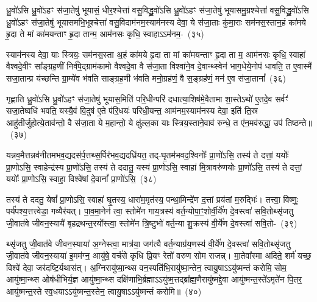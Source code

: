 {\anuvakamend[{वि ह्य॑ष्टाविꣳ॑शतिश्च}]}%

ध्रु॒वो॑\-ऽसि ध्रु॒वो॑\-ऽहꣳ स॑जा॒तेषु॑ भूयासं॒ धीर॒श्चेत्ता॑ वसु॒विद्ध्रु॒वो॑\-ऽसि ध्रु॒वो॑\-ऽहꣳ स॑जा॒तेषु॑ भूयासमु॒ग्रश्चेत्ता॑ वसु॒विद्ध्रु॒वो॑\-ऽसि ध्रु॒वो॑\-ऽहꣳ स॑जा॒तेषु॑ भूयासमभि॒भूश्चेत्ता॑ वसु॒विदाम॑नम॒स्याम॑नस्य देवा॒ ये स॑जा॒ताः कु॑मा॒राः सम॑नस॒स्तान॒हं का॑मये हृ॒दा ते मां का॑मयन्ताꣳ हृ॒दा तान्म॒ आम॑नसः कृधि॒ स्वाहा\-ऽऽ\-म॑नम॒-~(३५)

स्याम॑नस्य देवा॒ याः स्त्रियः॒ सम॑नस॒स्ता अ॒हं का॑मये हृ॒दा ता मां का॑मयन्ताꣳ हृ॒दा ता म॒ आम॑नसः कृधि॒ स्वाहा॑ वैश्वदे॒वीꣳ सा᳚ङ्ग्रह॒णीं निर्व॑पे॒द्ग्राम॑कामो वैश्वदे॒वा वै स॑जा॒ता विश्वा॑ने॒व दे॒वान्थ्स्वेन॑ भाग॒धेये॒नोप॑ धावति॒ त ए॒वास्मै॑ सजा॒तान्प्र य॑च्छन्ति ग्रा॒म्ये॑व भ॑वति साङ्ग्रह॒णी भ॑वति मनो॒ग्रह॑णं॒ वै स॒ङ्ग्रह॑णं॒ मन॑ ए॒व स॑जा॒तानां᳚~(३६)

गृह्णाति ध्रु॒वो॑\-ऽसि ध्रु॒वो॑\-ऽहꣳ स॑जा॒तेषु॑ भूयास॒मिति॑ परि॒धीन्परि॑ दधात्या॒शिष॑मे॒वैतामा शा॒स्ते\-ऽथो॑ ए॒तदे॒व सर्वꣳ॑ सजा॒तेष्वधि॑ भवति॒ यस्यै॒वं वि॒दुष॑ ए॒ते प॑रि॒धयः॑ परिधी॒यन्त॒ आम॑नम॒स्याम॑नस्य देवा॒ इति॑ ति॒स्र आहु॑तीर्जुहोत्ये॒ताव॑न्तो॒ वै स॑जा॒ता ये म॒हान्तो॒ ये क्षु॑ल्ल॒का याः स्त्रिय॒स्ताने॒वाव॑ रुन्धे॒ त ए॑न॒मव॑रुद्धा॒ उप॑ तिष्ठन्ते॥~(३७)

{\anuvakamend[{स्वाहाम॑नमसि सजा॒तानाꣳ॑ रुन्धे॒ पञ्च॑ च}]}%

यन्नव॒मैत्तन्नव॑नीतमभव॒द्यदस॑र्प॒त्तथ्स॒र्पिर॑भव॒द्यदध्रि॑यत॒ तद्-घृ॒तम॑\-भव\-द॒श्विनोः᳚ प्रा॒णो॑\-ऽसि॒ तस्य॑ ते दत्तां॒ ययोः᳚ प्रा॒णो\-ऽसि॒ स्वाहेन्द्र॑स्य प्रा॒णो॑\-ऽसि॒ तस्य॑ ते ददातु॒ यस्य॑ प्रा॒णो\-ऽसि॒ स्वाहा॑ मि॒त्रावरु॑णयोः प्रा॒णो॑\-ऽसि॒ तस्य॑ ते दत्तां॒ ययोः᳚ प्रा॒णो\-ऽसि॒ स्वाहा॒ विश्वे॑षां दे॒वानां᳚ प्रा॒णो॑\-ऽसि॒~(३८)

तस्य॑ ते ददतु॒ येषां᳚ प्रा॒णो\-ऽसि॒ स्वाहा॑ घृ॒तस्य॒ धारा॑म॒मृत॑स्य॒ पन्था॒मिन्द्रे॑ण द॒त्तां प्रय॑तां म॒रुद्भिः॑। तत्त्वा॒ विष्णुः॒ पर्य॑पश्य॒त्तत्त्वेडा॒ गव्यैर॑यत्। पा॒व॒मा॒नेन॑ त्वा॒ स्तोमे॑न गाय॒त्रस्य॑ वर्त॒न्योपा॒ꣳ॒शोर्वी॒र्ये॑ण दे॒वस्त्वा॑ सवि॒तोथ्सृ॑जतु जी॒वात॑वे जीवन॒स्यायै॑ बृहद्रथन्त॒रयो᳚स्त्वा॒ स्तोमे॑न त्रि॒ष्टुभो॑ वर्त॒न्या शु॒क्रस्य॑ वी॒र्ये॑ण दे॒वस्त्वा॑ सवि॒तो-~(३९)

थ्सृ॑जतु जी॒वात॑वे जीवन॒स्याया॑ अ॒ग्नेस्त्वा॒ मात्र॑या॒ जग॑त्यै वर्त॒न्याग्र॑य॒णस्य॑ वी॒र्ये॑ण दे॒वस्त्वा॑ सवि॒तोथ्सृ॑जतु जी॒वात॑वे जीवन॒स्याया॑ इ॒मम॑ग्न॒ आयु॑षे॒ वर्च॑से कृधि प्रि॒यꣳ रेतो॑ वरुण सोम राजन्न्। मा॒तेवा᳚स्मा अदिते॒ शर्म॑ यच्छ॒ विश्वे॑ देवा॒ जर॑दष्टि॒र्यथास॑त्। अ॒ग्निरायु॑ष्मा॒न्थ्स वन॒स्पति॑भि॒रायु॑ष्मा॒न्तेन॒ त्वायु॒षा\-ऽऽ\-यु॑ष्मन्तं करोमि॒ सोम॒ आयु॑ष्मा॒न्थ्स ओष॑धीभिर्य॒ज्ञ आयु॑ष्मा॒न्थ्स दक्षि॑णाभि॒र्ब्रह्मा\-ऽऽ\-यु॑ष्म॒त्तद्ब्रा᳚ह्म॒णैरायु॑ष्मद्दे॒वा आयु॑ष्मन्त॒स्ते॑\-ऽमृते॑न पि॒तर॒ आयु॑ष्मन्त॒स्ते स्व॒धया\-ऽऽ\-यु॑ष्मन्त॒स्तेन॒ त्वायु॒षा\-ऽऽ\-यु॑ष्मन्तं करोमि॥~(४०)

